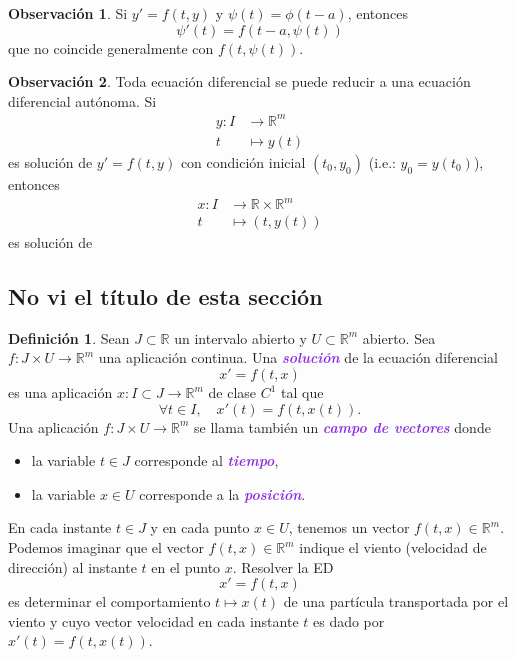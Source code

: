 \documentclass{article}
\theoremstyle{definition}
\newtheorem{definition}[theorem]{Definición}
\newtheorem*{obs}{Observación}
\theoremstyle{remark}
\numberwithin{equation}{section}
\newcommand{\R}{\mathbb{R}}
\newcommand{\wea}[1]{\textcolor{BlueViolet}{\textbf{\emph{#1}}}}
\begin{document}
\begin{obs}
    Si $y' = f(t,y)$ y $\psi(t) = \phi(t-a)$, entonces
    \[ \psi'(t) = f(t-a,\psi(t)) \]
    que no coincide generalmente con $f(t,\psi(t))$.
\end{obs}

\begin{obs}
    Toda ecuación diferencial se puede reducir a una ecuación diferencial autónoma. Si
    \begin{align*}
        y \colon I &\to \R^m \\ 
        t  &\mapsto y(t) 
    \end{align*}
    es solución de $y' = f(t,y)$ con condición inicial $(t_0,y_0)$ (i.e.: $y_0 = y(t_0)$), entonces
    \begin{align*}
        x \colon I &\to \R \times \R^m \\ 
        t &\mapsto (t,y(t))
    \end{align*}
    es solución de %
\end{obs}

\newpage
\subsection{No vi el título de esta sección}

\begin{definition}
    Sean $J \subset \R$ un intervalo abierto y $U \subset \R^m$ abierto. Sea $f \colon J \times U \to \R^m$ una aplicación continua. Una \wea{solución} de la ecuación diferencial
    \[ x' = f(t,x) \]
    es una aplicación $x \colon I \subset J \to \R^m$ de clase $C^1$ tal que
    \[ \forall t \in I, \quad x'(t) = f(t,x(t)). \]
    Una aplicación $f \colon J \times U \to \R^m$ se llama también un \wea{campo de vectores} donde
    \begin{itemize}
        \item la variable $t \in J$ corresponde al \wea{tiempo},
        \item la variable $x \in U$ corresponde a la \wea{posición}.
    \end{itemize}
\end{definition}

En cada instante $t \in J$ y en cada punto $x \in U$, tenemos un vector $f(t,x) \in \R^m$. Podemos imaginar que el vector $f(t,x) \in \R^m$ indique el viento (velocidad de dirección) al instante $t$ en el punto $x$. Resolver la ED
\[ x' = f(t,x) \]
es determinar el comportamiento $t \mapsto x(t)$ de una partícula transportada por el viento y cuyo vector velocidad en cada instante $t$ es dado por $x'(t) = f(t,x(t))$.
\end{document}
